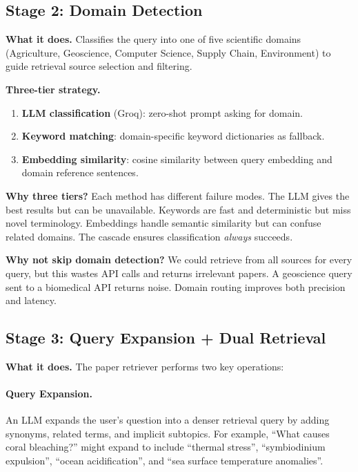 \documentclass[11pt]{article}
\begin{document}
\subsection{Stage 2: Domain Detection}

\textbf{What it does.} Classifies the query into one of five scientific domains (Agriculture, Geoscience, Computer Science, Supply Chain, Environment) to guide retrieval source selection and filtering.

\textbf{Three-tier strategy.}
\begin{enumerate}[leftmargin=1.2em]
  \item \textbf{LLM classification} (Groq): zero-shot prompt asking for domain.
  \item \textbf{Keyword matching}: domain-specific keyword dictionaries as fallback.
  \item \textbf{Embedding similarity}: cosine similarity between query embedding and domain reference sentences.
\end{enumerate}

\textbf{Why three tiers?} Each method has different failure modes. The LLM gives the best results but can be unavailable. Keywords are fast and deterministic but miss novel terminology. Embeddings handle semantic similarity but can confuse related domains. The cascade ensures classification \emph{always} succeeds.

\textbf{Why not skip domain detection?} We could retrieve from all sources for every query, but this wastes API calls and returns irrelevant papers. A geoscience query sent to a biomedical API returns noise. Domain routing improves both precision and latency.

\subsection{Stage 3: Query Expansion + Dual Retrieval}

\textbf{What it does.} The paper retriever performs two key operations:

\paragraph{Query Expansion.} An LLM expands the user's question into a denser retrieval query by adding synonyms, related terms, and implicit subtopics. For example, ``What causes coral bleaching?'' might expand to include ``thermal stress'', ``symbiodinium expulsion'', ``ocean acidification'', and ``sea surface temperature anomalies''.
\end{document}
